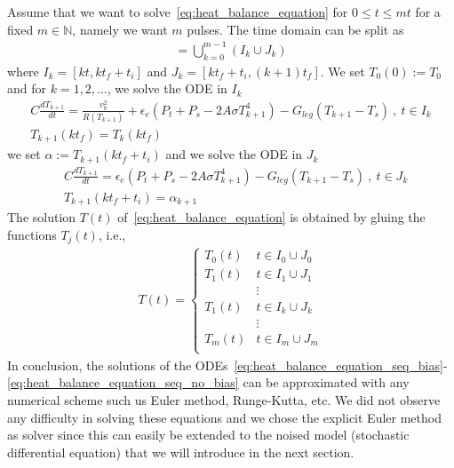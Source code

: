 Assume that we want to solve~\eqref{eq:heat_balance_equation} for $0 \le t \le m t$ for a fixed $m \in \mathbb{N}$, namely we want $m$ pulses. The time domain can be split as
\begin{align*}
 [0, m t_f] = \bigcup_{k=0}^{m-1} (I_k \cup J_k)
\end{align*}
where $I_k=[k t, k t_f+t_i]$ and $J_k = [k t_f + t_i, (k+1)t_f]$.
We set $T_0(0):=T_0$ and for $k=1, 2, \dots$, we solve the ODE in $I_k$
\begin{align} \label{eq:heat_balance_equation_seq_bias}
& C\frac{dT_{k+1}}{dt}=\frac{v_b^2}{R(T_{k+1})}+\epsilon_e(P_t+P_s -2A\sigma T_{k+1}^4)-G_{leg}(T_{k+1}-T_s) \ , \ t \in I_k \nonumber \\
& T_{k+1}(kt_f)=T_{k}(kt_f)&
\end{align}
we set $\alpha:=T_{k+1}(kt_f+t_i)$ and we solve the ODE in $J_k$
\begin{align} \label{eq:heat_balance_equation_seq_no_bias}
& C\frac{dT_{k+1}}{dt}=\epsilon_e(P_t+P_s -2A\sigma T_{k+1}^4)-G_{leg}(T_{k+1}-T_s) \ , \ t \in J_k \nonumber \\
&T_{k+1}(kt_f+t_i)=\alpha_{k+1}
\end{align}
The solution $T(t)$ of~\eqref{eq:heat_balance_equation} is obtained by gluing the functions $T_j(t)$, i.e.,
\begin{align*}
 T(t) =
 \begin{cases}
  T_0(t) & t \in I_0 \cup J_0	\\
  T_1(t) & t \in I_1 \cup J_1	\\
	 & \vdots 		\\
  T_1(t) & t \in I_k \cup J_k	\\
	 & \vdots		\\
  T_m(t) & t \in I_m \cup J_m	\\
 \end{cases}
\end{align*}
In conclusion, the solutions of the ODEs~\eqref{eq:heat_balance_equation_seq_bias}-\eqref{eq:heat_balance_equation_seq_no_bias} can be approximated with any numerical scheme such us Euler method, Runge-Kutta, etc. We did not observe any difficulty in solving these equations and we chose the explicit Euler method as solver since this can easily be extended to the noised model (stochastic differential equation) that we will introduce in the next section.


